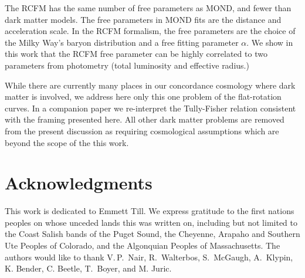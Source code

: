 \documentclass[reprint,%
 amsmath,amssymb,
 aps,
]{revtex4-1}
\begin{document}
The RCFM has the same number of free parameters as MOND, and fewer than dark matter models. The free parameters in MOND fits are the distance and acceleration scale. In the RCFM formalism, the free parameters are the choice of the Milky Way's baryon distribution and a free fitting parameter $\alpha$. 
We show in this work that the RCFM free    parameter  can be highly correlated to two parameters from  photometry  (total luminosity and effective radius.) 
  
 
While there are currently many places in our concordance cosmology where dark matter is involved, we address here only this one problem of the flat-rotation curves. In a companion paper we   re-interpret the Tully-Fisher relation consistent with the framing presented here. All other dark matter problems are removed from the present discussion as requiring cosmological assumptions which are beyond the scope of the this work. 
 
 
  
  
   

  \section[]{Acknowledgments}
 This work is dedicated to Emmett Till. We express     gratitude to the first nations peoples on whose unceded lands this was written on, including but not limited to  the Coast Salish bands of the Puget Sound, 
 the Cheyenne, Arapaho and Southern Ute  Peoples of Colorado, and the Algonquian Peoples of Massachusetts. 
  The authors would like to thank    V.\,P.\,  Nair,   R.\, Walterbos, S.\ McGaugh,  A.\, Klypin, K. Bender, C. Beetle,     T.\, Boyer, and M. Juric.   \\
  
 
\end{document}
